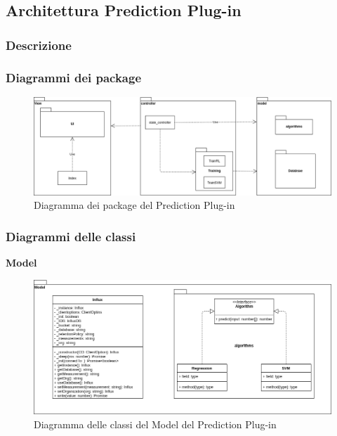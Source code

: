 \subsection{Architettura Prediction Plug-in}

\subsubsection{Descrizione}

\subsubsection{Diagrammi dei package}
\begin{figure}[H]
\centering
\includegraphics[scale=0.40]{../../Diagrams/Package_diagrams/plugin_design_pattern.png}
\caption{Diagramma dei package del Prediction Plug-in}
\end{figure}

\subsubsection{Diagrammi delle classi}
\textbf{Model}
\begin{figure}[H]
\centering
\includegraphics[scale=0.5]{../../Diagrams/Classes_diagrams/plugin_model.png}
\caption{Diagramma delle classi del Model del Prediction Plug-in}
\end{figure}

